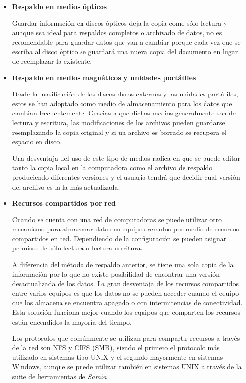 \newpage
    \begin{itemize}

      \item \textbf{Respaldo en medios \'{opticos}}

Guardar informaci\'{o}n en discos \'{o}pticos deja la copia como s\'{o}lo lectura y aunque sea ideal para respaldos completos o archivado de datos, no es recomendable para guardar datos que van a cambiar porque cada vez que se escriba al disco \'{o}ptico se guardar\'{a} una nueva copia del documento en lugar de reemplazar la existente.

      \item \textbf{Respaldo en medios magn\'{e}ticos y unidades port\'{a}tiles}

Desde la masificaci\'{o}n de los discos duros externos y las unidades port\'{a}tiles, estos se han adoptado como medio de almacenamiento para los datos que cambian frecuentemente. Gracias a que dichos medios generalmente son de lectura y escritura, las modificaciones de los archivos pueden guardarse reemplazando la copia original y si un archivo es borrado se recupera el espacio en disco.

Una desventaja del uso de este tipo de medios radica en que se puede editar tanto la copia local en la computadora como el archivo de respaldo produciendo diferentes versiones y el usuario tendr\'{a} que decidir cual versi\'{o}n del archivo es la la m\'{a}s actualizada.

      \item \textbf{Recursos compartidos por red}

Cuando se cuenta con una red de computadoras se puede utilizar otro mecanismo para almacenar datos en equipos remotos por medio de recursos compartidos en red. Dependiendo de la configuraci\'{o}n se pueden asignar permisos de s\'{o}lo lectura o lectura-escritura.

A diferencia del m\'{e}todo de respaldo anterior, se tiene una sola copia de la informaci\'{o}n por lo que no existe posibilidad de encontrar una versi\'{o}n desactualizada de los datos. La gran desventaja de los recursos compartidos entre varios equipos es que los datos no se pueden acceder cuando el equipo que los almacena se encuentra apagado o con intermitencias de conectividad. Esta soluci\'{o}n funciona mejor cuando los equipos que comparten los recursos est\'{a}n encendidos la mayor\'{i}a del tiempo.

Los protocolos que com\'{u}nmente se utilizan para compartir recursos a trav\'{e}s de la red son \textsc{NFS} y \textsc{CIFS} (\textsc{SMB}), siendo el primero el protocolo m\'{a}s utilizado en sistemas tipo \textsc{UNIX} y el segundo mayormente en sistemas Windows, aunque se puede utilizar tambi\'{e}n en sistemas \textsc{UNIX} a trav\'{e}s de la suite de herramientas de \textit{Samba} \cite{_samba_????}.


\end{itemize}
